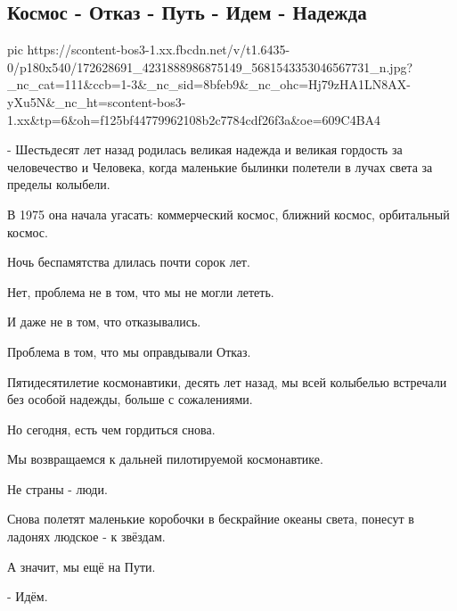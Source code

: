  
 
 
 
 
\subsection{Космос - Отказ - Путь - Идем - Надежда}
\label{sec:12_04_2021.fb.arestovich_aleksei.1.gagarin_kosmos}

\ifcmt
  pic https://scontent-bos3-1.xx.fbcdn.net/v/t1.6435-0/p180x540/172628691_4231888986875149_5681543353046567731_n.jpg?_nc_cat=111&ccb=1-3&_nc_sid=8bfeb9&_nc_ohc=Hj79zHA1LN8AX-yXu5N&_nc_ht=scontent-bos3-1.xx&tp=6&oh=f125bf44779962108b2c7784cdf26f3a&oe=609C4BA4
\fi

- Шестьдесят лет назад родилась великая надежда и великая гордость за
человечество и Человека, когда маленькие былинки полетели в лучах света за
пределы колыбели.

В 1975 она начала угасать: коммерческий космос, ближний космос, орбитальный
космос.

Ночь беспамятства длилась почти сорок лет.

Нет, проблема не в том, что мы не могли лететь. 

И даже не в том, что отказывались.

Проблема в том, что мы оправдывали Отказ. 

Пятидесятилетие космонавтики, десять лет назад, мы всей колыбелью встречали без
особой надежды, больше с сожалениями.

Но сегодня, есть чем гордиться снова.

Мы возвращаемся к дальней пилотируемой космонавтике.

Не страны - люди.

Снова полетят маленькие коробочки в бескрайние океаны света, понесут в ладонях
людское - к звёздам.

А значит, мы ещё на Пути.

- Идём.
